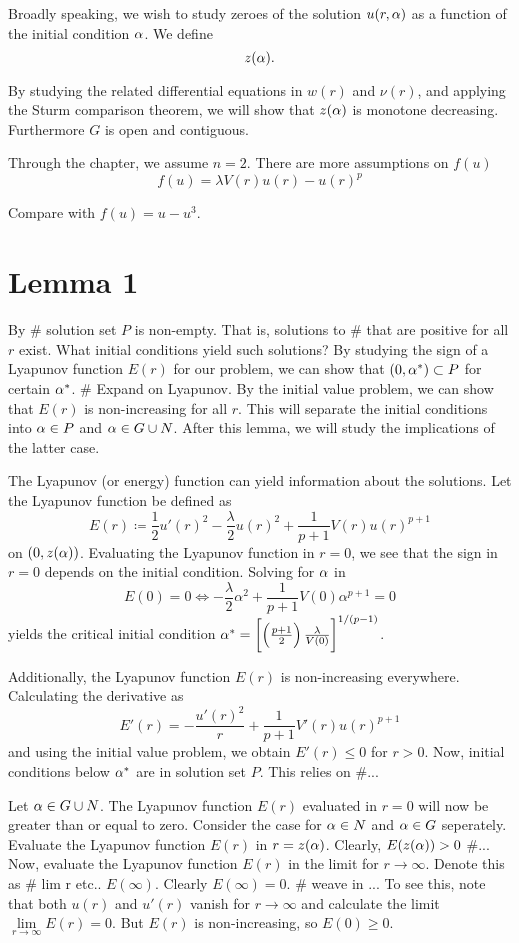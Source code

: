 Broadly speaking, we wish to study zeroes of the solution $u(r,\alpha)$ as a
function of the initial condition $\alpha$. {\red We define}
\[ z(\alpha). \]

By studying the related differential equations in $w(r)$ and $\nu(r)$, and
applying the Sturm comparison theorem, we will show that $z(\alpha)$ is
monotone decreasing. Furthermore {\red $G$ is open and contiguous}.

Through the chapter, we assume $n=2$. There are more assumptions on $f(u)$
\[ f(u) = \lambda V(r)u(r) - u(r)^p \]

{\red Compare with $f(u)=u-u^3$}.

\section{Lemma 1}
By \# solution set $P$ is non-empty. That is, solutions to \# that are positive
for all $r$ exist. What initial conditions yield such solutions? By studying
the sign of a Lyapunov function $E(r)$ for our problem, we can show that
$(0,\alpha^*)\subset P$ for certain $\alpha^*$. \# Expand on Lyapunov. By the initial
value problem, we can show that $E(r)$ is non-increasing for all $r$. This will
separate the initial conditions into $\alpha\in P$ and $\alpha\in G\cup N$. After this
lemma, we will study the implications of the latter case.

The Lyapunov (or energy) function can yield information about the solutions.
Let the Lyapunov function be defined as
$$E(r)\coloneqq\frac{1}{2}u'(r)^2-\frac{\lambda}{2}u(r)^2+\frac{1}{p+1}V(r)u(r)^{p+1}$$
on $(0,z(\alpha))$. Evaluating the Lyapunov function in $r=0$, we see that the sign
in $r=0$ depends on the initial condition. Solving for $\alpha$ in
$$E(0)=0\iff-\frac{\lambda}{2}\alpha^2+\frac{1}{p+1}V(0)\alpha^{p+1}=0$$ yields
the critical initial condition
$\alpha^*=\left[\left(\frac{p+1}{2}\right)\frac{\lambda}{V(0)} \right]^{1/(p-1)}$. 

Additionally, the Lyapunov function $E(r)$ is non-increasing everywhere.
Calculating the derivative as
$$E'(r)=-\frac{u'(r)^2}{r}+\frac{1}{p+1}V'(r)u(r)^{p+1}$$ and using the initial
value problem, we obtain $E'(r)\leq0$ for $r>0$. Now, initial conditions below
$\alpha^*$ are in solution set $P$. This relies on \#...  

Let $\alpha\in G\cup N$. The Lyapunov function $E(r)$ evaluated in $r=0$ will now
be greater than or equal to zero. Consider the case for $\alpha\in N$ and $\alpha\in G$
seperately. Evaluate the Lyapunov function $E(r)$ in $r=z(\alpha)$. Clearly,
$E(z(\alpha))>0$ \#... Now, evaluate the Lyapunov function $E(r)$ in the limit for
$r\to\infty$. Denote this as \# lim r etc.. $E(\infty)$. Clearly $E(\infty)=0$.
\# weave in ... To see this, note that both $u(r)$ and $u'(r)$ vanish for
$r\to\infty$ and calculate the limit $\underset{r\to\infty}{\lim}E(r)=0$. But
$E(r)$ is non-increasing, so $E(0)\geq0$.

